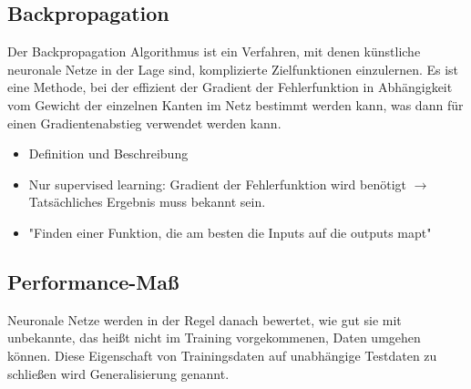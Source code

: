




\subsection{Backpropagation}

Der Backpropagation Algorithmus ist ein Verfahren, mit denen künstliche neuronale Netze in der Lage sind, komplizierte Zielfunktionen einzulernen.
Es ist eine Methode, bei der effizient der Gradient der Fehlerfunktion in Abhängigkeit vom Gewicht der einzelnen Kanten im Netz bestimmt werden kann,
was dann für einen Gradientenabstieg verwendet werden kann. 

\color{blue}
\begin{itemize}
	\item Definition und Beschreibung
	\item Nur supervised learning: Gradient der Fehlerfunktion wird benötigt \(\rightarrow\) Tatsächliches Ergebnis muss bekannt sein.
	\item "Finden einer Funktion, die am besten die Inputs auf die outputs mapt"
\end{itemize}
\color{black}

\subsection{Performance-Maß}

Neuronale Netze werden in der Regel danach bewertet, wie gut sie mit unbekannte, das heißt nicht im Training vorgekommenen, Daten umgehen können.
Diese Eigenschaft von Trainingsdaten auf unabhängige Testdaten zu schließen wird Generalisierung genannt. 

